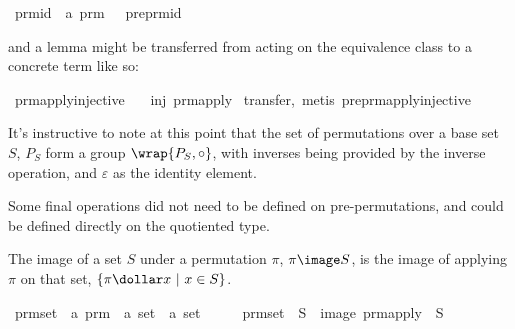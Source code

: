 \begin{implementation}
\isamarkupfalse%
\ prm{\isacharunderscore}id\ {\isacharcolon}{\isacharcolon}\ {\isachardoublequoteopen}{\isacharprime}a\ prm{\isachardoublequoteclose}\ {\isacharparenleft}{\isachardoublequoteopen}{\isasymepsilon}{\isachardoublequoteclose}{\isacharparenright}\ \ preprm{\isacharunderscore}id%
\end{implementation}

and a lemma might be transferred from acting on the equivalence class to a concrete term like so:

\begin{implementation}
\isamarkupfalse%
\ prm{\isacharunderscore}apply{\isacharunderscore}injective{\isacharcolon}\isanewline
\ \ \ {\isachardoublequoteopen}inj\ {\isacharparenleft}prm{\isacharunderscore}apply\ {\isasympi}{\isacharparenright}{\isachardoublequoteclose}\isanewline
%
\isadelimproof
%
\endisadelimproof
%
\isatagproof
{}\isamarkupfalse%
{\isacharparenleft}transfer,\ metis\ preprm{\isacharunderscore}apply{\isacharunderscore}injective{\isacharparenright}%
\endisatagproof
\end{implementation}

It's instructive to note at this point that the set of permutations over a base set \(S\), \(P_S\) form a group \(\wrap{P_S, \circ}\), with inverses being provided by the inverse operation, and \(\varepsilon\) as the identity element.

Some final operations did not need to be defined on pre-permutations, and could be defined directly on the quotiented type.

\begin{definition}
The image of a set \(S\) under a permutation \(\pi\), \(\pi \image S\), is the image of applying \(\pi\) on that set, \(\{\pi \dollar x\ |\ x \in S\}\).
\end{definition}

\begin{implementation}
\isamarkupfalse%
\ prm{\isacharunderscore}set\ {\isacharcolon}{\isacharcolon}\ {\isachardoublequoteopen}{\isacharprime}a\ prm\ {\isasymRightarrow}\ {\isacharprime}a\ set\ {\isasymRightarrow}\ {\isacharprime}a\ set{\isachardoublequoteclose}\ {\isacharparenleft}\ {\isachardoublequoteopen}{\isacharbraceleft}{\isachardollar}{\isacharbraceright}{\isachardoublequoteclose}\ {}{}{}{\isacharparenright}\ \isanewline \ \ {\isachardoublequoteopen}prm{\isacharunderscore}set\ {\isasympi}\ S\ {\isasymequiv}\ image\ {\isacharparenleft}prm{\isacharunderscore}apply\ {\isasympi}{\isacharparenright}\ S{\isachardoublequoteclose}\isanewline
\end{implementation}

